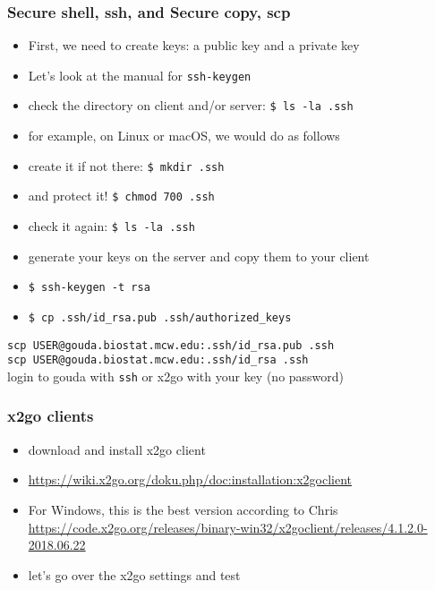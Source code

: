 \documentclass[11pt,pdftex,dvipsnames,usenames,helvetica]{beamer}
\begin{document}
\begin{frame}
\frametitle{Secure shell, ssh, and Secure copy, scp}

\begin{itemize}
\item First, we need to create keys: a public key
and a private key
\item Let's look at the manual for {\tt ssh-keygen}
\item check the directory on client and/or server: {\tt \$ ls -la .ssh}
\item for example, on Linux or macOS, we would do as follows
\item create it if not there: {\tt \$ mkdir .ssh}
\item and protect it! {\tt \$ chmod 700 .ssh}
\item check it again: {\tt \$ ls -la .ssh}
\item generate your keys on the server and copy them to your client
\item {\tt \$ ssh-keygen -t rsa}
\item {\tt \$ cp .ssh/id\_rsa.pub .ssh/authorized\_keys}
\end{itemize}
{\tt scp USER@gouda.biostat.mcw.edu:.ssh/id\_rsa.pub .ssh}\\
{\tt scp USER@gouda.biostat.mcw.edu:.ssh/id\_rsa .ssh}\\
login to gouda with {\tt ssh} or x2go with your key (no password)
\end{frame}

\begin{frame}
\frametitle{x2go clients}

\begin{itemize}
\item download and install x2go client
\item \url{https://wiki.x2go.org/doku.php/doc:installation:x2goclient}
\item For Windows, this is the best version according to Chris
\url{https://code.x2go.org/releases/binary-win32/x2goclient/releases/4.1.2.0-2018.06.22}
\item let's go over the x2go settings and test
\end{itemize}
\end{frame}

\begin{comment}
\begin{verbatim}
mkdir ~/.ssh
ssh-keygen -t rsa
chmod 700 ~/.ssh
cp ~/.ssh/id_rsa.pub ~/.ssh/authorized_keys
chmod 600 ~/.ssh/authorized_keys ~/.ssh/id_rsa
\end{verbatim}
\end{frame}
\end{comment}
\end{document}
